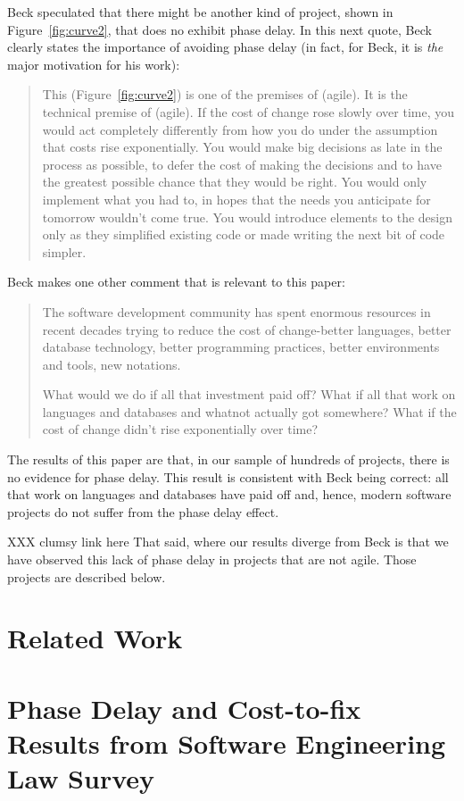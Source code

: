 \documentclass{sig-alternate}
\newcommand{\fig}[1]{Figure~\ref{fig:#1}}
\begin{document}
Beck speculated that there might be another kind of project, shown in \fig{curve2},
that does no exhibit phase delay. In this next quote, Beck clearly states
the importance of avoiding phase delay (in fact, for Beck, it is {\em the} major
motivation for his work):
\begin{quote}
This (\fig{curve2}) is one of the premises of (agile). It is the technical premise of (agile). If the cost of change rose slowly over time, you would act completely differently from how you do under the assumption that costs rise exponentially. You would make big decisions as late in the process as possible, to defer the cost of making the decisions and to have the greatest possible chance that they would be right. You would only implement what you had to, in hopes that the needs you anticipate for tomorrow wouldn't come true. You would introduce elements to the design only as they simplified existing code or made writing the next bit of code simpler.~\cite{beck00}
\end{quote}
Beck makes one other comment that is relevant to this paper: 
\begin{quote}
The software development community has spent enormous resources in recent decades trying to reduce the cost of change-better languages, better database technology, better programming practices, better environments and tools, new notations.

What would we do if all that investment paid off? What if all that work on languages and databases and whatnot actually got somewhere? What if the cost of change didn't rise exponentially over time?~\cite{beck00}
\end{quote}
The results of this paper are that, in our sample of hundreds of projects, there is no evidence for phase delay.
This result is   consistent with Beck being correct: all that work on    languages and databases
have paid off and, hence, modern software projects do not suffer from the  phase delay effect.  

XXX clumsy link here
That said, where our results
diverge from Beck is that we have observed this lack of phase delay in  projects that are not agile. Those
projects are described below.

\section{Related Work}
 



\section{Phase Delay and Cost-to-fix Results from Software Engineering Law Survey}
\end{document}
